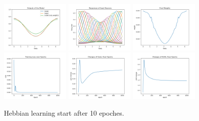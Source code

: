 \documentclass[12pt, a4paper]{article}
\begin{document}
\begin{figure}[H]
    \centering
    \includegraphics[width=0.3\textwidth]{baseline_abb05/fig/0122_abb05_bphebb_onlyweights.png}
    \includegraphics[width=0.3\textwidth]{baseline_abb05/fig/0122_abb05_bphebb_rf.png}
    \includegraphics[width=0.3\textwidth]{baseline_abb05/fig/0122_abb05_bphebb_weights.png}
    \\
    \includegraphics[width=0.3\textwidth]{baseline_abb05/fig/0122_abb05_bphebb_loss.png}
    \includegraphics[width=0.3\textwidth]{baseline_abb05/fig/0122_abb05_bphebb_gc.png}
    \includegraphics[width=0.3\textwidth]{baseline_abb05/fig/0122_abb05_bphebb_sc.png}\\
    \caption{Hebbian learning start after 10 epoches.}
\end{figure}
\end{document}
